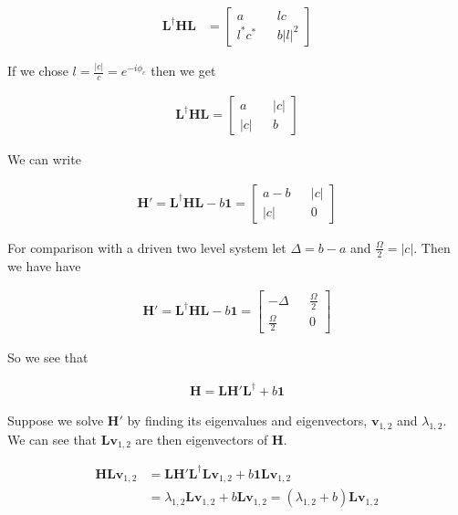 \documentclass[12pt]{article}
\newcommand{\bv}[1]{\boldsymbol{#1}}
\begin{document}
\begin{align}
\bv{L}^{\dag} \bv{H} \bv{L} &= 
\begin{bmatrix}
a && lc\\
l^*c^* && b |l|^2
\end{bmatrix}
\end{align}

If we chose $l = \frac{|c|}{c} = e^{-i\phi_c}$ then we get

\begin{align}
\bv{L}^{\dag}\bv{H} \bv{L} = 
\begin{bmatrix}
a && |c|\\
|c| && b
\end{bmatrix}
\end{align}

We can write

\begin{align}
\bv{H}' = \bv{L}^{\dag}\bv{H}\bv{L} - b\bv{1} =
\begin{bmatrix}
a-b && |c|\\
|c| && 0
\end{bmatrix}
\end{align}

For comparison with a driven two level system let $\Delta = b-a$ and $\frac{\Omega}{2} = |c|$. Then we have have

\begin{align}
\bv{H}' = \bv{L}^{\dag}\bv{H}\bv{L} - b\bv{1} =
\begin{bmatrix}
-\Delta && \frac{\Omega}{2}\\
\frac{\Omega}{2} && 0
\end{bmatrix}
\end{align}

So we see that

\begin{align}
\bv{H} = \bv{L}\bv{H}'\bv{L}^{\dag} + b\bv{1}
\end{align}

Suppose we solve $\bv{H'}$ by finding its eigenvalues and eigenvectors, $\bv{v}_{1,2}$ and $\lambda_{1,2}$. We can see that $\bv{L}\bv{v}_{1,2}$ are then eigenvectors of $\bv{H}$.

\begin{align}
\bv{H}\bv{L}\bv{v}_{1,2} &= \bv{L}\bv{H}'\bv{L}^{\dag}\bv{L}\bv{v}_{1,2} + b\bv{1}\bv{L}\bv{v}_{1,2}\\
&= \lambda_{1,2} \bv{L} \bv{v}_{1,2} + b \bv{L}\bv{v}_{1,2} = (\lambda_{1,2} + b) \bv{L}\bv{v}_{1,2}
\end{align}
\end{document}
